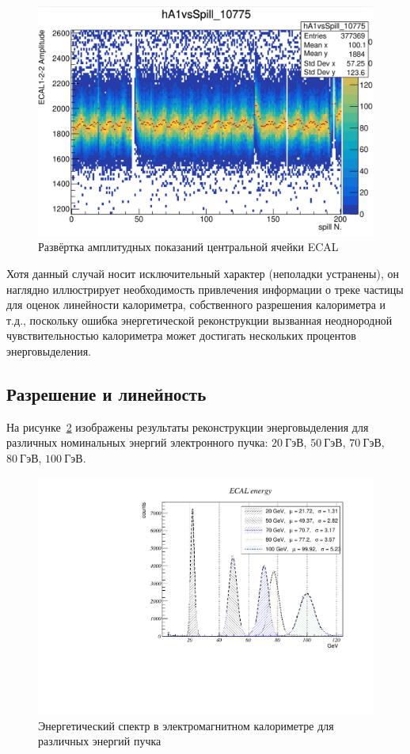 \begin{figure}
    \centering
    \includegraphics[width=1\linewidth]{images//illustrative/edep-fluctuations-run10775.png}
    \caption{Развёртка амплитудных показаний центральной ячейки ECAL}
    \label{fig:edep-fluctuations}
\end{figure}

Хотя данный случай носит исключительный характер (неполадки устранены),
он наглядно иллюстрирует необходимость привлечения информации о
треке частицы для оценок линейности калориметра, собственного
разрешения калориметра и т.д., поскольку ошибка энергетической
реконструкции вызванная неоднородной чувствительностью калориметра
может достигать нескольких процентов энерговыделения.

\subsection{Разрешение и линейность}

На рисунке~\ref{fig:ecal-linearity-test} изображены результаты
реконструкции энерговыделения для различных номинальных энергий
электронного пучка: $20~\text{ГэВ}$, $50~\text{ГэВ}$, $70~\text{ГэВ}$,
$80~\text{ГэВ}$, $100~\text{ГэВ}$.

\begin{figure}
    \centering
    \includegraphics[width=0.75\linewidth]{images/lintest-2.pdf}
    \caption{Энергетический спектр в электромагнитном калориметре
    для различных энергий пучка}
    \label{fig:ecal-linearity-test}
\end{figure}
